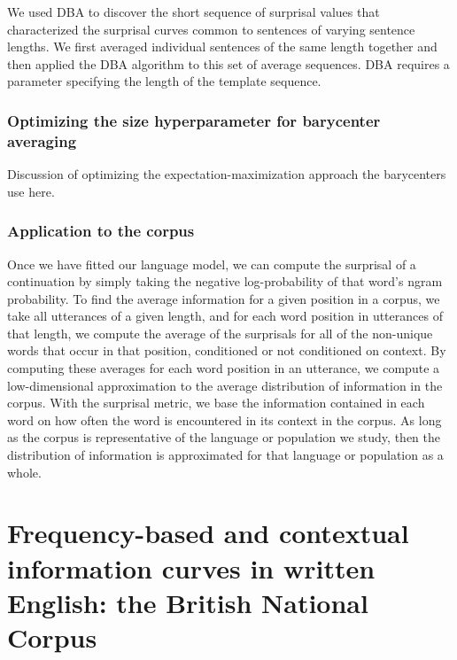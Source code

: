 \documentclass[man,floatsintext]{apa6}
\begin{document}
We used DBA to discover the short sequence of surprisal values that characterized the surprisal curves common to sentences of varying sentence lengths. We first averaged individual sentences of the same length together and then applied the DBA algorithm to this set of average sequences. DBA requires a parameter specifying the length of the template sequence.

\hypertarget{optimizing-the-size-hyperparameter-for-barycenter-averaging}{%
\subsubsection{Optimizing the size hyperparameter for barycenter averaging}\label{optimizing-the-size-hyperparameter-for-barycenter-averaging}}

Discussion of optimizing the expectation-maximization approach the barycenters use here.

\hypertarget{application-to-the-corpus}{%
\subsubsection{Application to the corpus}\label{application-to-the-corpus}}

Once we have fitted our language model, we can compute the surprisal of a continuation by simply taking the negative log-probability of that word's ngram probability. To find the average information for a given position in a corpus, we take all utterances of a given length, and for each word position in utterances of that length, we compute the average of the surprisals for all of the non-unique words that occur in that position, conditioned or not conditioned on context. By computing these averages for each word position in an utterance, we compute a low-dimensional approximation to the average distribution of information in the corpus. With the surprisal metric, we base the information contained in each word on how often the word is encountered in its context in the corpus. As long as the corpus is representative of the language or population we study, then the distribution of information is approximated for that language or population as a whole.

\hypertarget{frequency-based-and-contextual-information-curves-in-written-english-the-british-national-corpus}{%
\section{Frequency-based and contextual information curves in written English: the British National Corpus}\label{frequency-based-and-contextual-information-curves-in-written-english-the-british-national-corpus}}
\end{document}

